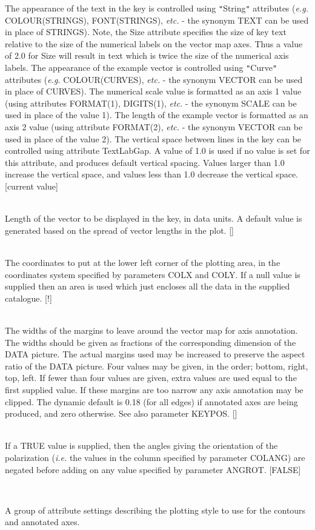 \documentclass[twoside,11pt]{article}
\renewcommand{\_}{\texttt{\symbol{95}}}
\newcommand{\sstsubsection}[1]{ \item[{#1}] \mbox{} \\}
\newcommand{\sstsubsection}[1]{\item[{#1}]}
\begin{document}
{{{         The appearance of the text in the key is controlled using {\tt "}String{\tt "}
         attributes (\emph{e.g.} COLOUR(STRINGS), FONT(STRINGS), \emph{etc.} - the synonym
         TEXT can be used in place of STRINGS). Note, the Size attribute
         specifies the size of key text relative to the size of the numerical
         labels on the vector map axes. Thus a value of 2.0 for Size will
         result in text which is twice the size of the numerical axis labels.
         The appearance of the example vector is controlled using {\tt "}Curve{\tt "}
         attributes (\emph{e.g.} COLOUR(CURVES), \emph{etc.} - the synonym VECTOR can be
         used in place of CURVES). The numerical scale value is formatted as
         an axis 1 value (using attributes FORMAT(1), DIGITS(1), \emph{etc.} - the
         synonym SCALE can be used in place of the value 1). The length of
         the example vector is formatted as an axis 2 value (using attribute
         FORMAT(2), \emph{etc.} - the synonym VECTOR can be used in place of the
         value 2). The vertical space between lines in the key can be
         controlled using attribute TextLabGap. A value of 1.0 is used if
         no value is set for this attribute, and produces default vertical
         spacing. Values larger than 1.0 increase the vertical space, and
         values less than 1.0 decrease the vertical space. [current value]
      }
      \sstsubsection{
         KEYVEC = \_REAL (Read)
      }{
         Length of the vector to be displayed in the key, in data units.
         A default value is generated based on the spread of vector
         lengths in the plot. []
      }
      \sstsubsection{
         LBND(2) = \_REAL (Read)
      }{
         The coordinates to put at the lower left corner of the plotting
         area, in the coordinates system specified by parameters COLX and
         COLY. If a null value is supplied then an area is used which just
         encloses all the data in the supplied catalogue. [!]
      }
      \sstsubsection{
         MARGIN( 4 ) = \_REAL (Read)
      }{
         The widths of the margins to leave around the vector map for axis
         annotation. The widths should be given as fractions of the
         corresponding dimension of the DATA picture.
         The actual margins used may be increased to preserve the aspect
         ratio of the DATA picture. Four values may be given, in the order;
         bottom, right, top, left. If fewer than four values are given,
         extra values are used equal to the first supplied value. If these
         margins are too narrow any axis annotation may be clipped. The
         dynamic default is 0.18 (for all edges) if annotated axes are being
         produced, and zero otherwise. See also parameter KEYPOS. []
      }
      \sstsubsection{
         NEGATE = \_LOGICAL (Read)
      }{
         If a TRUE value is supplied, then the angles giving the
         orientation of the polarization (\emph{i.e.} the values in the column
         specified by parameter COLANG) are negated before adding on any 
         value specified by parameter ANGROT. [FALSE]
      }
      \sstsubsection{
         STYLE = GROUP (Read)
      }{
         A group of attribute settings describing the plotting style to use
         for the contours and annotated axes.

}}}
\end{document}
